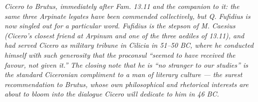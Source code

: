 
\textit{Cicero to Brutus, immediately after \textit{Fam.} 13.11
and the companion to it: the same three Arpinate legates have been
commended collectively, but Q. Fufidius is now singled out for a
particular word. Fufidius is the stepson of M. Caesius (Cicero's
closest friend at Arpinum and one of the three aediles of 13.11),
and had served Cicero as military tribune in Cilicia in 51--50 BC,
where he conducted himself with such generosity that the proconsul
``seemed to have received the favour, not given it.'' The closing
note that he is ``no stranger to our studies'' is the standard
Ciceronian compliment to a man of literary culture --- the surest
recommendation to Brutus, whose own philosophical and rhetorical
interests are about to bloom into the dialogue Cicero will dedicate
to him in 46 BC.}
